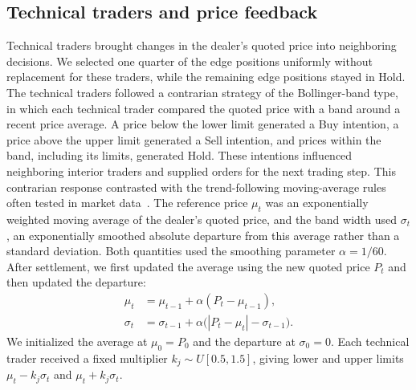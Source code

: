\subsection{Technical traders and price feedback}

Technical traders brought changes in the dealer's quoted price into
neighboring decisions. We selected one quarter of the edge positions uniformly without
replacement for these traders, while the remaining edge positions stayed
in Hold. The technical traders followed a contrarian strategy of
the Bollinger-band type, in which each technical trader compared the
quoted price with a band around a recent price average. A price below
the lower limit generated a Buy intention, a price above the upper limit
generated a Sell intention, and prices within the band, including its
limits, generated Hold. These intentions influenced neighboring interior
traders and supplied orders for the next trading step. This contrarian
response contrasted with the trend-following moving-average rules often
tested in market data~\cite{brock1992simple}. The reference price
$\mu_t$ was an exponentially weighted moving average of the dealer's
quoted price, and the band width used $\sigma_t$, an exponentially
smoothed absolute departure from this average rather than a standard
deviation. Both quantities used the smoothing parameter $\alpha=1/60$.
After settlement, we first updated the average using the new quoted
price $P_t$ and then updated the departure:
\begin{equation}
 \begin{aligned}
 \mu_t &= \mu_{t-1}+\alpha(P_t-\mu_{t-1}),\\
 \sigma_t &= \sigma_{t-1}+\alpha\bigl(|P_t-\mu_t|-\sigma_{t-1}\bigr).
 \end{aligned}
 \label{eq:adaptive-band}
\end{equation}
We initialized the average at $\mu_0=P_0$ and the departure at
$\sigma_0=0$. Each technical trader received a fixed multiplier $k_j\sim
U[0.5,1.5]$, giving lower and upper limits $\mu_t-k_j\sigma_t$ and
$\mu_t+k_j\sigma_t$.

